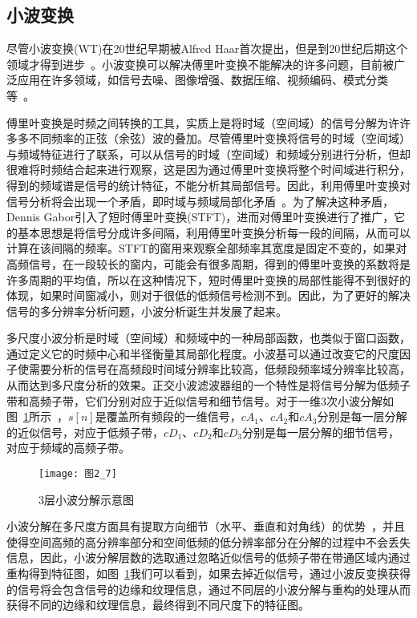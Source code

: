 \subsection{小波变换}
\label{2_2_3}

尽管小波变换(WT)在20世纪早期被Alfred Haar首次提出，但是到20世纪后期这个领域才得到进步~\cite{Merry2013wavelet}。小波变换可以解决傅里叶变换不能解决的许多问题，目前被广泛应用在许多领域，如信号去噪、图像增强、数据压缩、视频编码、模式分类等~\cite{ImamogluTMM2013wavelet}。

傅里叶变换是时频之间转换的工具，实质上是将时域（空间域）的信号分解为许许多多不同频率的正弦（余弦）波的叠加。尽管傅里叶变换将信号的时域（空间域）与频域特征进行了联系，可以从信号的时域（空间域）和频域分别进行分析，但却很难将时频结合起来进行观察，这是因为通过傅里叶变换将整个时间域进行积分，得到的频域谱是信号的统计特征，不能分析其局部信号。因此，利用傅里叶变换对信号分析将会出现一个矛盾，即时域与频域局部化矛盾~\cite{Merry2013wavelet,Fugal2009book,Kocyigit2013EMG,Semmlow2004book}。为了解决这种矛盾，Dennis Gabor引入了短时傅里叶变换(STFT)，进而对傅里叶变换进行了推广，它的基本思想是将信号分成许多间隔，利用傅里叶变换分析每一段的间隔，从而可以计算在该间隔的频率。STFT的窗用来观察全部频率其宽度是固定不变的，如果对高频信号，在一段较长的窗内，可能会有很多周期，得到的傅里叶变换的系数将是许多周期的平均值，所以在这种情况下，短时傅里叶变换的局部性能得不到很好的体现，如果时间窗减小，则对于很低的低频信号检测不到。因此，为了更好的解决信号的多分辨率分析问题，小波分析诞生并发展了起来。

多尺度小波分析是时域（空间域）和频域中的一种局部函数，也类似于窗口函数，通过定义它的时频中心和半径衡量其局部化程度。小波基可以通过改变它的尺度因子使需要分析的信号在高频段时间域分辨率比较高，低频段频率域分辨率比较高，从而达到多尺度分析的效果。正交小波滤波器组的一个特性是将信号分解为低频子带和高频子带，它们分别对应于近似信号和细节信号。对于一维$3$次小波分解如图~\ref{图2_7}所示~\cite{Fugal2009book}，$s[n]$是覆盖所有频段的一维信号，$cA_{1}$、$cA_{2}$和$cA_{3}$分别是每一层分解的近似信号，对应于低频子带，$cD_{1}$、$cD_{2}$和$cD_{3}$分别是每一层分解的细节信号，对应于频域的高频子带。
\begin{figure}[t] %
  \centering
  \texttt{[image: 图2\_7]}
  \caption{3层小波分解示意图}
  \label{图2_7}
\end{figure}

小波分解在多尺度方面具有提取方向细节（水平、垂直和対角线）的优势~\cite{Merry2013wavelet,Semmlow2004book}，并且使得空间高频的高分辨率部分和空间低频的低分辨率部分在分解的过程中不会丢失信息，因此，小波分解层数的选取通过忽略近似信号的低频子带在带通区域内通过重构得到特征图，如图~\ref{图2_7}我们可以看到，如果去掉近似信号，通过小波反变换获得的信号将会包含信号的边缘和纹理信息，通过不同层的小波分解与重构的处理从而获得不同的边缘和纹理信息，最终得到不同尺度下的特征图。

